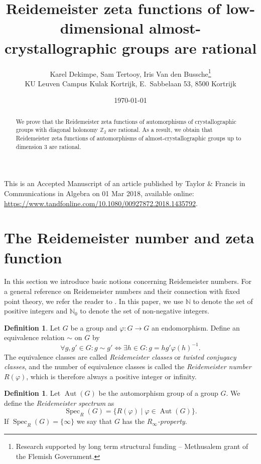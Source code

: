 \documentclass[a4paper]{article}
\title{Reidemeister zeta functions of low-dimensional almost-crystallographic groups are rational}
\author{Karel Dekimpe, Sam Tertooy, Iris Van den Bussche\thanks{Research supported  by long term structural funding -- Methusalem grant of the Flemish Government.}\\
KU Leuven Campus Kulak Kortrijk, E.~Sabbelaan 53, 8500 Kortrijk}
\date{\today}
\theoremstyle{plain}
\theoremstyle{definition}
\newtheorem{defn}[theorem]{Definition}
\theoremstyle{remark}
\DeclareMathOperator{\Aut}{Aut}
\newcommand{\NN}{{\mathbb{N}}}
\newcommand{\ZZ}{{\mathbb{Z}}}
\DeclareMathOperator{\Spec}{Spec}
\begin{document}
	
	\maketitle
	
		\begin{center}
	This is an Accepted Manuscript of an article published by Taylor \& Francis in Communications in Algebra on 01 Mar 2018, available online:  \href{https://doi.org/10.1080/00927872.2018.1435792}{https://www.tandfonline.com/10.1080/00927872.2018.1435792}.
	\end{center}
	
\begin{abstract}
We prove that the Reidemeister zeta functions of automorphisms of crystallographic groups with diagonal holonomy \(\ZZ_2\) are rational. As a result, we obtain that Reidemeister zeta functions of automorphisms of almost-crystallographic groups up to dimension \(3\) are rational.
\end{abstract}

\section{The Reidemeister number and zeta function}
In this section we introduce basic notions concerning Reidemeister numbers. For a general reference on Reidemeister numbers and their connection with fixed point theory, we refer the reader to \cite{jian83-1}. In this paper, we use \(\NN\) to denote the set of positive integers and \(\NN_0\) to denote the set of non-negative integers. 
\begin{defn}
	Let \(G\) be a group and \(\varphi: G \to G\) an endomorphism. Define an equivalence relation \(\sim\) on \(G\) by
	\begin{equation*}
	\forall g,g' \in G: g \sim g' \iff \exists h \in G: g = hg'\varphi(h)^{-1}.
	\end{equation*}
	The equivalence classes are called \emph{Reidemeister classes} or \emph{twisted conjugacy classes}, and the number of equivalence classes is called the \emph{Reidemeister number} \(R(\varphi)\), which is therefore always a positive integer or infinity.
\end{defn}

\begin{defn}
	Let \(\Aut(G)\) be the automorphism group of a group \(G\). We define the \emph{Reidemeister spectrum} as
	\begin{equation*}
	\Spec_R(G) = \{R(\varphi) \mid \varphi \in \Aut(G)\}.
	\end{equation*}
	If \(\Spec_R(G) = \{\infty\}\) we say that \(G\) has the \emph{\(R_\infty\)-property}. 
\end{defn}
\end{document}
